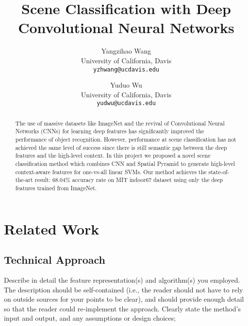 \documentclass[10pt,twocolumn,letterpaper]{article}
\begin{document}
\title{Scene Classification with Deep Convolutional Neural Networks}

\author{Yangzihao Wang\\
University of California, Davis\\
{\tt\small yzhwang@ucdavis.edu}
\and
Yuduo Wu\\
University of California, Davis\\
{\tt\small yudwu@ucdavis.edu}
}

\maketitle

\begin{abstract}
The use of massive datasets like ImageNet and the revival of Convolutional
Neural Networks (CNNs) for learning deep features has significantly improved
the performance of object recognition. However, performance at scene
classification has not achieved the same level of success since there is still
semantic gap between the deep features and the high-level context.  In this
project we proposed a novel scene classification method which combines CNN and
Spatial Pyramid to generate high-level context-aware features for one-vs-all
linear SVMs. Our method achieves the state-of-the-art result: 68.04\% accuracy
rate on MIT indoor67 dataset using only the deep features trained from
ImageNet. 
 
\end{abstract}

\section{Related Work}
\label{sec:related}


\subsection{Technical Approach}

Describe in detail the feature representation(s) and algorithm(s) you employed.
The description should be self-contained (i.e., the reader should not have to
rely on outside sources for your points to be clear), and should provide enough
detail so that the reader could re-implement the approach.  Clearly state the
method's input and output, and any assumptions or design choices;
\end{document}
